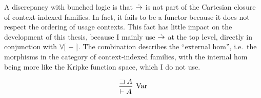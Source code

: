 A discrepancy with bunched logic is that $\mathrel{\dot\to}$ is not part of the Cartesian
closure of context-indexed families.
In fact, it fails to be a functor because it does not respect the ordering of
usage contexts.
This fact has little impact on the development of this thesis, because I mainly
use $\mathrel{\dot\to}$ at the top level, directly in conjunction with $\forallb{-}$.
The combination describes the ``external hom'', i.e.\ the morphisms in the
category of context-indexed families, with the internal hom being more like the
Kripke function space, which I do not use.


\begin{figure}
  \begin{displaymath}
    \begin{prooftree}
      \hypo{\sqni A}
      \infer1[Var]{\vdash A}
    \end{prooftree}
  \end{displaymath}


\end{figure}
